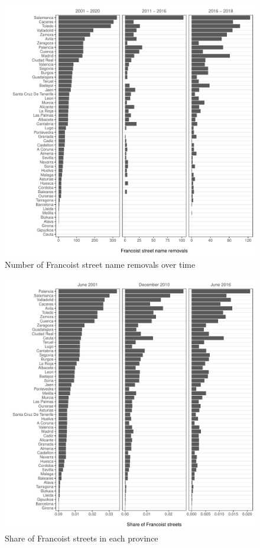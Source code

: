 \documentclass[12pt, titlepage]{article}
\begin{document}
\begin{figure}[htb!]
\centering

  \includegraphics[width = \textwidth]{img/changes_by_prov}

  \caption{Number of Francoist street name removals over time}\label{fig:changes_by_prov}

\end{figure}

\begin{figure}[htb!]
\centering

  \includegraphics[width = \textwidth]{img/fs_by_prov}

  \caption{Share of Francoist streets in each province}\label{fig:fs_by_prov}

\end{figure}
\end{document}
